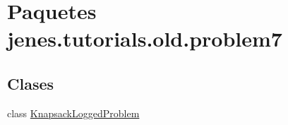 \hypertarget{namespacejenes_1_1tutorials_1_1old_1_1problem7}{\section{Paquetes jenes.\-tutorials.\-old.\-problem7}
\label{namespacejenes_1_1tutorials_1_1old_1_1problem7}
}
\subsection*{Clases}
\begin{DoxyCompactItemize}
\item 
class \hyperlink{classjenes_1_1tutorials_1_1old_1_1problem7_1_1_knapsack_logged_problem}{Knapsack\-Logged\-Problem}
\end{DoxyCompactItemize}

